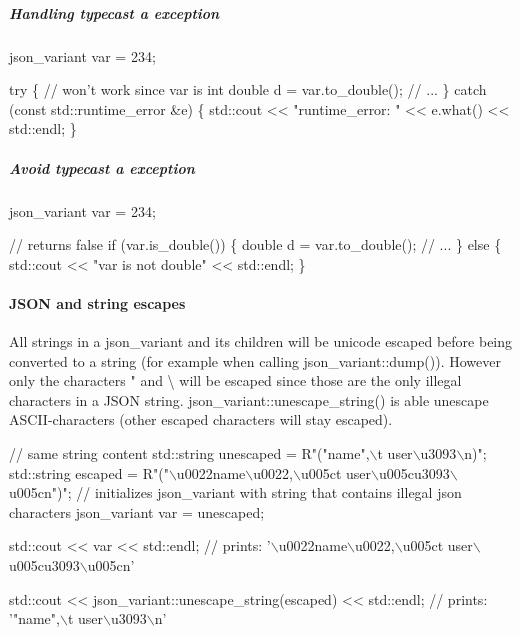 \subparagraph*{\label{_handling_typecast_expception_section}%
Handling typecast a exception}


\begin{DoxyCode}
json\_variant var = 234;

\textcolor{keywordflow}{try} \{
    \textcolor{comment}{// won't work since var is int}
    \textcolor{keywordtype}{double} d = var.to\_double();  
    \textcolor{comment}{// ...}
\}
\textcolor{keywordflow}{catch} (\textcolor{keyword}{const} std::runtime\_error &e) \{
    std::cout << \textcolor{stringliteral}{"runtime\_error: "} << e.what() << std::endl;   
\} 
\end{DoxyCode}


\subparagraph*{\label{_avoid_typecast_exception_section}%
Avoid typecast a exception}


\begin{DoxyCode}
json\_variant var = 234;

\textcolor{comment}{// returns false}
\textcolor{keywordflow}{if} (var.is\_double()) \{
    \textcolor{keywordtype}{double} d = var.to\_double();   
    \textcolor{comment}{// ...}
\}
\textcolor{keywordflow}{else} \{
    std::cout << \textcolor{stringliteral}{"var is not double"} << std::endl;   
\}
\end{DoxyCode}


\paragraph*{\label{_json_and_string_escapes_section}%
J\+S\+ON and string escapes}

All strings in a {\ttfamily json\+\_\+variant} and its children will be unicode escaped before being converted to a string (for example when calling {\ttfamily json\+\_\+variant\+::dump()}). However only the characters " and \textbackslash{} will be escaped since those are the only illegal characters in a J\+S\+ON string. {\ttfamily json\+\_\+variant\+::unescape\+\_\+string()} is able unescape A\+S\+C\+I\+I-\/characters (other escaped characters will stay escaped).


\begin{DoxyCode}
\textcolor{comment}{// same string content}
std::string unescaped = R\textcolor{stringliteral}{"("name",\(\backslash\)t user\(\backslash\)u3093\(\backslash\)n)";}
\textcolor{stringliteral}{std::string escaped   = R}\textcolor{stringliteral}{"("\(\backslash\)u0022name\(\backslash\)u0022,\(\backslash\)u005ct user\(\backslash\)u005cu3093\(\backslash\)u005cn")";}
\textcolor{stringliteral}{}
\textcolor{stringliteral}{}\textcolor{comment}{// initializes json\_variant with string that contains illegal json characters}
json\_variant var = unescaped;

std::cout << var << std::endl;
\textcolor{comment}{// prints: '\(\backslash\)u0022name\(\backslash\)u0022,\(\backslash\)u005ct user\(\backslash\)u005cu3093\(\backslash\)u005cn'}

std::cout << json\_variant::unescape\_string(escaped) << std::endl;
\textcolor{comment}{// prints: '"name",\(\backslash\)t user\(\backslash\)u3093\(\backslash\)n'}
\end{DoxyCode}


